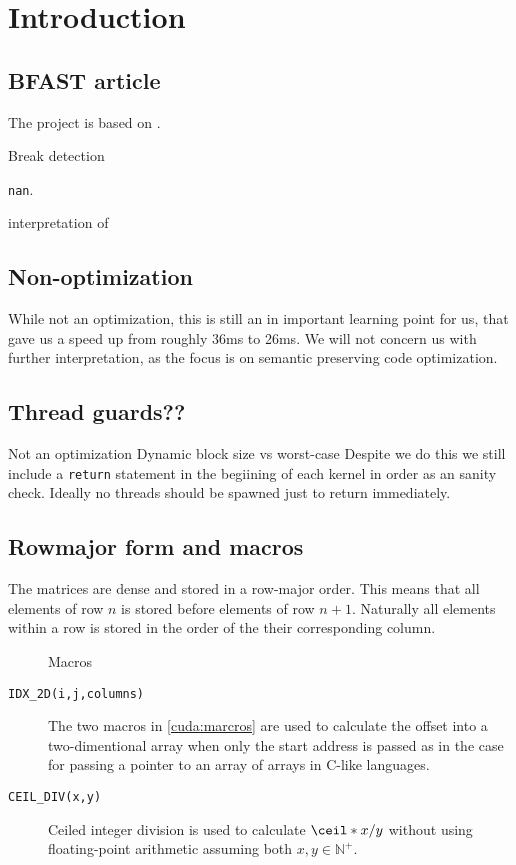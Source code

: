 \section{Introduction}

\subsection{\textsc{BFAST} article}
The project is based on \cite{bfast}.

Break detection

\texttt{nan}.

interpretation of


\subsection{Non-optimization}
While not an optimization, this is still an in important learning point for us,
that gave us a speed up from roughly 36ms to 26ms.
We will not concern us with further interpretation, as the focus is on
semantic preserving code optimization.


\subsection{Thread guards??}
Not an optimization Dynamic block size vs worst-case
Despite we do this we still include a \texttt{return} statement in the begiining
of each kernel in order as an sanity check. Ideally no threads should be spawned
just to return immediately.

\subsection{Rowmajor form and macros}

The matrices are dense and stored in a row-major order. This means that all elements
of row \(n\) is stored before elements of row \(n+1\). Naturally all elements
within a row is stored in the order of the their corresponding column.


\begin{figure}[H]
    \centering
    \caption{Macros}
    \label{cuda:macros}
\end{figure}


\begin{description}
    \item[\texttt{IDX\_2D(i,j,columns)}] The two macros in \autoref{cuda:marcros} are used to
calculate the offset into a two-dimentional array when only the start address is
passed as in the case for passing a pointer to an array of arrays in C-like languages.

\item[\texttt{CEIL\_DIV(x,y)}] Ceiled integer division is used to calculate
\(\ceil*{x/y}\) without using floating-point arithmetic assuming both \(x, y \in
\mathbb{N}^{+} \).

\end{description}

    



